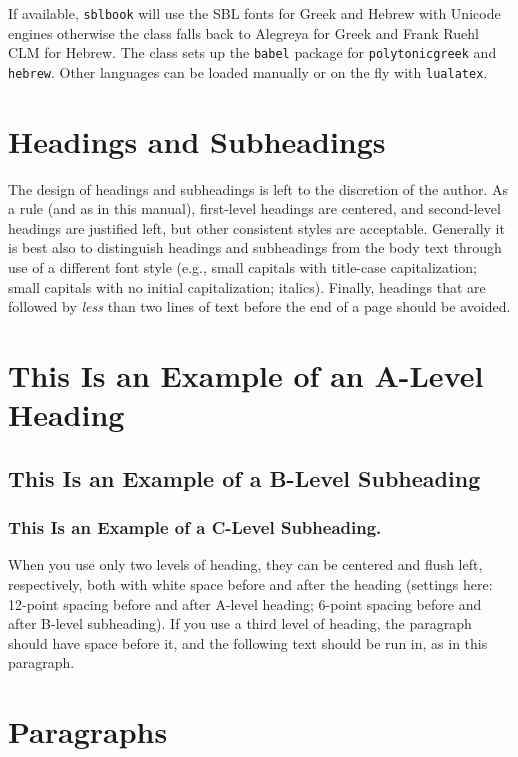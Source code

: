 \documentclass[sblidx={ancient sources, modern authors, subject}]{sblbook}
\begin{document}
If available, \texttt{sblbook} will use the SBL fonts for Greek and Hebrew
with Unicode engines otherwise the class falls back to Alegreya for Greek and
Frank Ruehl CLM for Hebrew. The class sets up the \texttt{babel} package for
\texttt{polytonicgreek} and \texttt{hebrew}. Other languages can be loaded
manually or on the fly with \texttt{lualatex}.

\section{Headings and Subheadings}

The design of headings and subheadings is left to the discretion of the
author. As a rule (and as in this manual), first-level headings are centered,
and second-level headings are justified left, but other consistent styles are
acceptable. Generally it is best also to distinguish headings and subheadings
from the body text through use of a different font style (e.g., small capitals
with title-case capitalization; small capitals with no initial capitalization;
italics). Finally, headings that are followed by \emph{less} than two lines of
text before the end of a page should be avoided.

\section*{This Is an Example of an A-Level Heading}

\subsection*{This Is an Example of a B-Level Subheading}

\subsubsection*{This Is an Example of a C-Level Subheading.}

When you use only two levels of heading, they can be centered and flush left,
respectively, both with white space before and after the heading (settings
here: 12-point spacing before and after A-level heading; 6-point spacing
before and after B-level subheading). If you use a third level of heading, the
paragraph should have space before it, and the following text should be run
in, as in this paragraph.

\section{Paragraphs}
\end{document}
